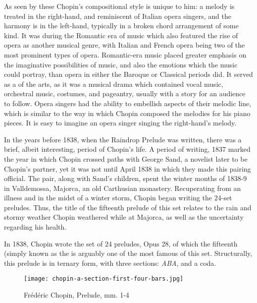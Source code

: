 As seen by these  Chopin's compositional style is unique to him: a melody is treated in the right-hand, and reminiscent of Italian opera singers, and the harmony is in the left-hand, typically in a broken chord arrangement of some kind. It was during the Romantic era of music which also featured the rise of opera as another musical genre, with Italian and French opera being two of the most prominent types of opera\autocite{Burkholder_Grout_Palisca_2014}. Romantic-era music placed greater emphasis on the imaginative possibilities of music, and also the emotions which the music could portray, than opera in either the Baroque or Classical periods did. It served as a  of the arts, as it was a musical drama which contained vocal music, orchestral music, costumes, and pageantry, usually with a story for an audience to follow. Opera singers had the ability to embellish aspects of their melodic line, which is similar to the way in which Chopin composed the melodies for his piano pieces. It is easy to imagine an opera singer singing the right-hand's melody.

In the years before 1838, when the Raindrop Prelude was written, there was a brief, albeit interesting, period of Chopin's life. A period of writing, 1837 marked the year in which Chopin crossed paths with George Sand, a novelist later to be Chopin's partner, yet it was not until April 1838 in which they made this pairing official. The pair, along with Sand's children, spent the winter months of 1838-9 in Valldemossa, Majorca, an old Carthusian monastery. Recuperating from an illness and in the midst of a winter storm, Chopin began writing the 24-set preludes\autocite{Samson_2001}. Thus, the title of the fifteenth prelude of this set relates to the rain and stormy weather Chopin weathered while at Majorca, as well as the uncertainty regarding his health.

In 1838, Chopin wrote the set of 24 preludes, Opus 28, of which the fifteenth (simply known as the  is arguably one of the most famous of this set. Structurally, this prelude is in ternary form, with three sections: \textit{ABA}, and a coda. 

\begin{figure}[h]
  \centering
  \texttt{[image: chopin-a-section-first-four-bars.jpg]}
  \caption{Frédéric Chopin, Prelude, mm. 1-4}
  \label{fig:chopin-a-section-first-four-bars}
\end{figure}

